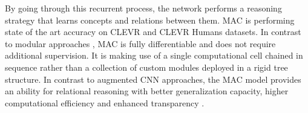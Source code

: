 By going through this recurrent process, the network performs a reasoning strategy that learns concepts and relations between them. MAC is performing state of the art accuracy on CLEVR and CLEVR Humans datasets.
In contrast to modular approaches \cite{andreas2016learning,hu2017learning,johnson2017inferring}, MAC is fully
differentiable and does not require additional supervision. It is making use of a single computational cell chained in sequence rather than a collection of custom modules deployed in a rigid tree structure.
In contrast to augmented CNN approaches, the MAC model provides an ability for relational reasoning with better generalization capacity, higher
computational efficiency and enhanced transparency \cite{hudson2018compositional}.

